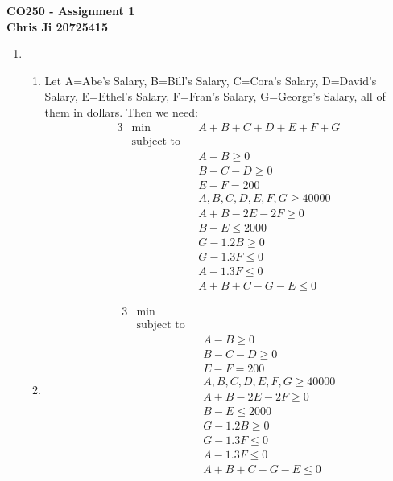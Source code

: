 \documentclass[10pt,english]{article}
\begin{document}
\noindent \begin{center}
\textbf{\large{}CO250 - Assignment 1}\\
\textbf{\large{}Chris Ji 20725415}
\par\end{center}{\large \par}
\medskip{}

\begin{enumerate}
\item \begin{enumerate}
    \item Let A=Abe's Salary, B=Bill's Salary, C=Cora's Salary, D=David's Salary, E=Ethel's Salary, F=Fran's Salary, G=George's Salary, all of them in dollars. Then we need:
\begin{alignat*}{3}
    &\text{min}&&A+B+C+D+E+F+G \\ 
    &\text{subject to}\\ 
    &&& A-B\geq 0 \\ 
    &&& B-C-D\geq 0 \\ 
    &&& E-F=200 \\ 
    &&& A,B,C,D,E,F,G\geq 40000 \\
    &&& A+B-2E-2F\geq0 \\ 
    &&& B-E\leq2000 \\
    &&& G-1.2B\geq 0 \\
    &&& G-1.3F\leq0 \\
    &&& A-1.3F\leq 0 \\  
    &&& A+B+C-G-E\leq 0
\end{alignat*}
    
    
    \item 
\begin{alignat*}{3}
    &\text{min}&& \\ 
    &\text{subject to}\\ 
    &&& A-B\geq 0 \\ 
    &&& B-C-D\geq 0 \\ 
    &&& E-F=200 \\ 
    &&& A,B,C,D,E,F,G\geq 40000 \\
    &&& A+B-2E-2F\geq0 \\ 
    &&& B-E\leq2000 \\
    &&& G-1.2B\geq 0 \\
    &&& G-1.3F\leq0 \\
    &&& A-1.3F\leq 0 \\  
    &&& A+B+C-G-E\leq 0
\end{alignat*}
    

\end{enumerate}
\end{enumerate}
\end{document}
